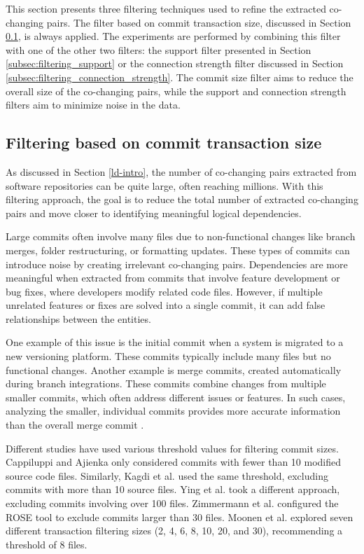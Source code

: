 This section presents three filtering techniques used to refine the extracted co-changing pairs. The filter based on commit transaction size, discussed in Section \ref{subsec:filtering_transaction_size}, is always applied. The experiments are performed by combining this filter with one of the other two filters: the support filter presented in Section \ref{subsec:filtering_support} or the connection strength filter discussed in Section \ref{subsec:filtering_connection_strength}. The commit size filter aims to reduce the overall size of the co-changing pairs, while the support and connection strength filters aim to minimize noise in the data.

\subsection{Filtering based on commit transaction size}
\label{subsec:filtering_transaction_size}

As discussed in Section \ref{ld-intro}, the number of co-changing pairs extracted from software repositories can be quite large, often reaching millions.  With this filtering approach, the goal is to reduce the total number of extracted co-changing pairs and move closer to identifying meaningful logical dependencies. 

Large commits often involve many files due to non-functional changes like branch merges, folder restructuring, or formatting updates. These types of commits can introduce noise by creating irrelevant co-changing pairs. Dependencies are more meaningful when extracted from commits that involve feature development or bug fixes, where developers modify related code files. However, if multiple unrelated features or fixes are solved into a single commit, it can add false relationships between the entities.

One example of this issue is the initial commit when a system is migrated to a new versioning platform. These commits typically include many files but no functional changes. Another example is merge commits, created automatically during branch integrations. These commits combine changes from multiple smaller commits, which often address different issues or features. In such cases, analyzing the smaller, individual commits provides more accurate information than the overall merge commit \cite{cluster-access}.

Different studies have used various threshold values for filtering commit sizes. Cappiluppi and Ajienka \cite{DBLP:journals/jss/AjienkaC17, DBLP:journals/ese/AjienkaCC18} only considered commits with fewer than 10 modified source code files. Similarly, Kagdi et al. used the same threshold, excluding commits with more than 10 source files. Ying et al. \cite{Ying-co-change} took a different approach, excluding commits involving over 100 files. Zimmermann et al. \cite{Zimmermann:2004:MVH:998675.999460} configured the ROSE tool to exclude commits larger than 30 files. Moonen et al. \cite{Moonen-commit} explored seven different transaction filtering sizes (2, 4, 6, 8, 10, 20, and 30), recommending a threshold of 8 files.




